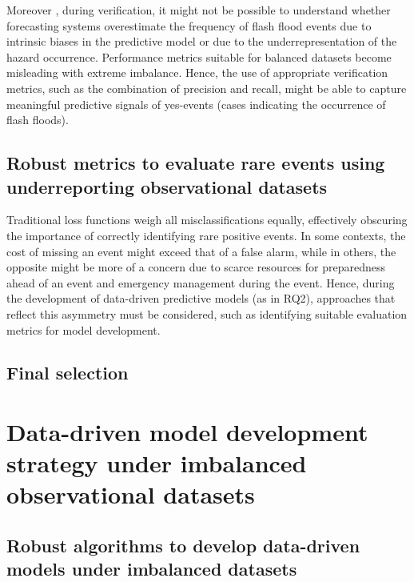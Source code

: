 Moreover , during verification, it might not be possible to understand whether forecasting systems overestimate the frequency of flash flood events due to intrinsic biases in the predictive model or due to the underrepresentation of the hazard occurrence. Performance metrics suitable for balanced datasets become misleading with extreme imbalance. Hence, the use of appropriate verification metrics, such as the combination of precision and recall, might be able to capture meaningful predictive signals of yes-events (cases indicating the occurrence of flash floods).

\subsection{Robust metrics to evaluate rare events using underreporting observational datasets}

Traditional  loss functions weigh all misclassifications equally, effectively obscuring the importance of correctly identifying rare positive events. In some contexts, the cost of missing an event might exceed that of a false alarm, while in others, the opposite might be more of a concern due to scarce resources for preparedness ahead of an event and emergency management during the event. Hence, during the development of data-driven predictive models (as in RQ2), approaches that reflect this asymmetry must be considered, such as identifying suitable evaluation metrics for model development. 

\subsection{Final selection}


\section{Data-driven model development strategy under imbalanced observational datasets}
\label{experimental_design_model_dev_imbalanced_data}

\subsection{Robust algorithms to develop data-driven models under imbalanced datasets}


